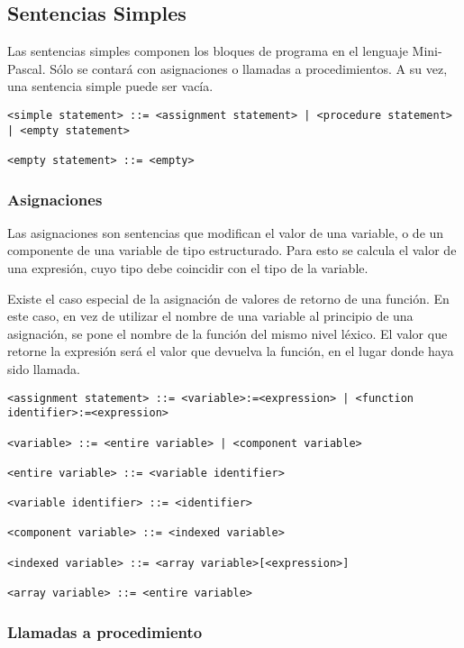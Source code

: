 \documentclass[a4paper,oneside]{report}
\begin{document}
\subsection{Sentencias Simples}
Las sentencias simples componen los bloques de programa en el lenguaje Mini-Pascal. Sólo se contará con asignaciones o llamadas a procedimientos. A su vez, una sentencia simple puede ser vacía.

\begin{verbatim}
<simple statement> ::= <assignment statement> | <procedure statement> | <empty statement>

<empty statement> ::= <empty>
\end{verbatim}

\subsubsection{Asignaciones}

Las asignaciones son sentencias que modifican el valor de una variable, o de un componente de una variable de tipo estructurado. Para esto se calcula el valor de una expresión, cuyo tipo debe coincidir con el tipo de la variable.

Existe el caso especial de la asignación de valores de retorno de una función. En este caso, en vez de utilizar el nombre de una variable al principio de una asignación, se pone el nombre de la función del mismo nivel léxico. El valor que retorne la expresión será el valor que devuelva la función, en el lugar donde haya sido llamada.

\begin{verbatim}
<assignment statement> ::= <variable>:=<expression> | <function identifier>:=<expression>

<variable> ::= <entire variable> | <component variable>

<entire variable> ::= <variable identifier>

<variable identifier> ::= <identifier>

<component variable> ::= <indexed variable>

<indexed variable> ::= <array variable>[<expression>]

<array variable> ::= <entire variable>
\end{verbatim}

\subsubsection{Llamadas a procedimiento}
\end{document}
